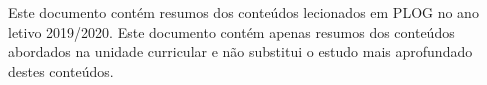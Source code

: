 \documentclass[../resumosPLOG.tex]{subfiles}
\begin{document}
 

Este documento contém resumos dos conteúdos lecionados em PLOG no ano letivo 2019/2020. Este documento contém apenas resumos dos conteúdos abordados na unidade curricular e não substitui o estudo mais aprofundado destes conteúdos.
\end{document}
